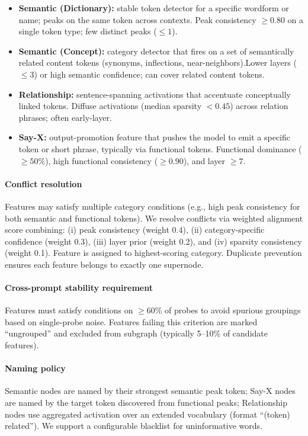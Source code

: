 \begin{itemize}
  \item \textbf{Semantic (Dictionary):} stable token detector for a specific wordform or name; peaks on the same token across contexts. Peak consistency $\ge 0.80$ on a single token type; few distinct peaks ($\le 1$).
  \item \textbf{Semantic (Concept):} category detector that fires on a set of semantically related content tokens (synonyms, inflections, near-neighbors).Lower layers ($\le 3$) or high semantic confidence; can cover related content tokens.
  \item \textbf{Relationship:} sentence-spanning activations that accentuate conceptually linked tokens. Diffuse activations (median sparsity $< 0.45$) across relation phrases; often early-layer.
  \item \textbf{Say-X:} output-promotion feature that pushes the model to emit a specific token or short phrase, typically via functional tokens. Functional dominance ($\ge 50\%$), high functional consistency ($\ge 0.90$), and layer $\ge 7$.
\end{itemize}

\paragraph{Conflict resolution}
Features may satisfy multiple category conditions (e.g., high peak consistency for both semantic and functional tokens). We resolve conflicts via weighted alignment score combining: (i) peak consistency (weight 0.4), (ii) category-specific confidence (weight 0.3), (iii) layer prior (weight 0.2), and (iv) sparsity consistency (weight 0.1). Feature is assigned to highest-scoring category. Duplicate prevention ensures each feature belongs to exactly one supernode.

\paragraph{Cross-prompt stability requirement}
Features must satisfy conditions on $\ge$60\% of probes to avoid spurious groupings based on single-probe noise. Features failing this criterion are marked ``ungrouped'' and excluded from subgraph (typically 5--10\% of candidate features).

\paragraph{Naming policy}
Semantic nodes are named by their strongest semantic peak token; Say-X nodes are named by the target token discovered from functional peaks; Relationship nodes use aggregated activation over an extended vocabulary (format ``(token) related''). We support a configurable blacklist for uninformative words.

